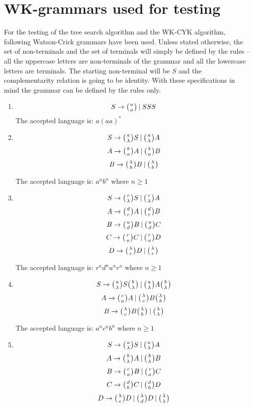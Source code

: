\section{WK-grammars used for testing}

For the testing of the tree search algorithm and the WK-CYK algorithm, following Watson-Crick grammars have been used. Unless stated otherwise, the set of non-terminals and the set of terminals will simply be defined by the rules -- all the uppercase letters are non-terminals of the grammar and all the lowercase letters are terminals. The starting non-terminal will be $S$ and the complementarity relation is going to be identity. With these specifications in mind the grammar can be defined by the rules only.

\begin{enumerate}
  \item{
    $$S \rightarrow \wkpair{a}{a} \:|\: S S S$$
    The accepted language is: $a(aa)^*$
  }

  \item{
    $$S \rightarrow \wkpair{a}{\lambda} S \:|\: \wkpair{a}{\lambda} A$$
    $$A \rightarrow \wkpair{b}{a} A \:|\: \wkpair{b}{a} B$$
    $$B \rightarrow \wkpair{\lambda}{b} B \:|\: \wkpair{\lambda}{b}$$


    The accepted language is: $a^nb^n$ where $n \geq 1$
  }

  \item{
    $$S \rightarrow \wkpair{r}{\lambda} S \:|\: \wkpair{r}{\lambda} A$$
    $$A \rightarrow \wkpair{d}{r} A \:|\: \wkpair{d}{r} B$$
    $$B \rightarrow \wkpair{u}{d} B \:|\: \wkpair{u}{d} C$$
    $$C \rightarrow \wkpair{r}{u} C \:|\: \wkpair{r}{u} D$$
    $$D \rightarrow \wkpair{\lambda}{r} D \:|\: \wkpair{\lambda}{r}$$

    The accepted language is: $r^nd^nu^nr^n$ where $n \geq 1$
  }

  \item{
    $$S \rightarrow \wkpair{a}{\lambda} S \wkpair{b}{\lambda} \:|\: \wkpair{a}{\lambda} A \wkpair{b}{\lambda}$$
    $$A \rightarrow \wkpair{c}{a} A \:|\: \wkpair{\lambda}{c} B \wkpair{\lambda}{b}$$
    $$B \rightarrow \wkpair{\lambda}{c} B \wkpair{\lambda}{b} \:|\: \wkpair{\lambda}{\lambda}$$

    The accepted language is: $a^nc^nb^n$ where $n \geq 1$
  }

  \item{
    $$S \rightarrow \wkpair{a}{\lambda} S \:|\: \wkpair{a}{\lambda} A$$
    $$A \rightarrow \wkpair{b}{\lambda} A \:|\: \wkpair{b}{\lambda} B$$
    $$B \rightarrow \wkpair{c}{a} B \:|\: \wkpair{c}{a} C$$
    $$C \rightarrow \wkpair{d}{b} C \:|\: \wkpair{d}{b} D$$
    $$D \rightarrow \wkpair{\lambda}{c} D \:|\: \wkpair{\lambda}{d} D \:|\: \wkpair{\lambda}{\lambda}$$

}
\end{enumerate}
